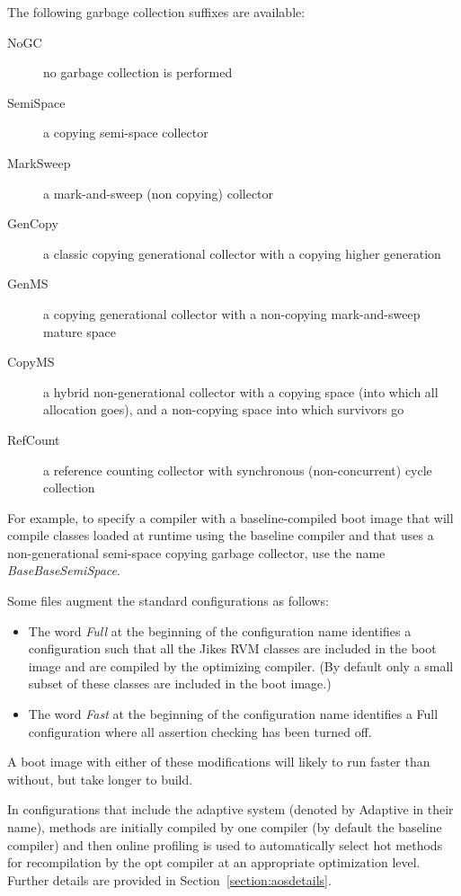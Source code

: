 The following garbage collection suffixes are available:

\begin{description}
\item[NoGC] no garbage collection is performed
\item[SemiSpace] a copying semi-space collector
\item[MarkSweep] a mark-and-sweep (non copying) collector
\item[GenCopy] a classic copying generational collector with a copying
  higher generation
\item[GenMS] a copying generational collector with a non-copying
  mark-and-sweep mature space
\item[CopyMS] a hybrid non-generational collector with a copying space
  (into which all allocation goes), and a non-copying space into which
  survivors go
\item[RefCount] a reference counting collector with synchronous
  (non-concurrent) cycle collection
\end{description}

For example, to specify a compiler with a baseline-compiled boot image
that will compile classes loaded at runtime using the baseline 
compiler and that uses a non-generational semi-space copying garbage
collector, use the name {\em BaseBaseSemiSpace}.

Some files augment the standard configurations as follows:
\begin{itemize}
\item The word 
{\em Full} at the beginning of the configuration name identifies a
configuration such that all the Jikes RVM classes are included in the
boot image and are compiled by the optimizing compiler.  (By default
only a small subset of these classes are included in the boot image.)
\item The word {\em Fast} at the beginning of the configuration name identifies a
Full configuration where all assertion checking has been turned off.
\end{itemize}
A boot image with either of these modifications will likely to run
faster than without, but take longer to build.

In configurations that include the adaptive system (denoted by
Adaptive in their name), methods are initially compiled by one
compiler (by default the baseline compiler) and then online profiling
is used to automatically select hot methods for recompilation by the
opt compiler at an appropriate optimization level. Further details are
provided in Section~\ref{section:aosdetails}.

